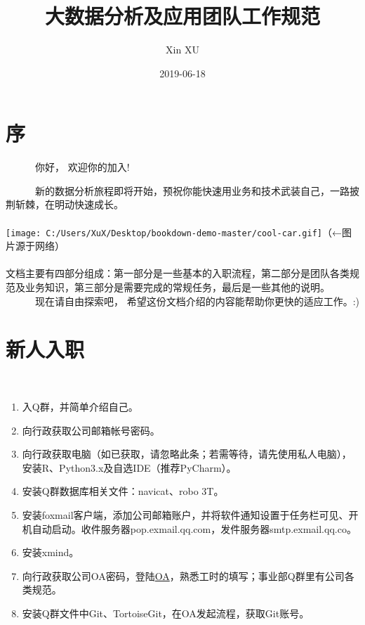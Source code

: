 \documentclass[]{book}
\title{大数据分析及应用团队工作规范}
\author{Xin XU}
\date{2019-06-18}
\begin{document}
\maketitle

{
\setcounter{tocdepth}{1}
\tableofcontents
}
\hypertarget{section}{%
\chapter{序}\label{section}}

~~~~~~你好， 欢迎你的加入!

~~~~~~新的数据分析旅程即将开始，预祝你能快速用业务和技术武装自己，一路披荆斩棘，在明动快速成长。\\
~\\
\hspace*{0.333em}\hspace*{0.333em}\hspace*{0.333em}\hspace*{0.333em}\hspace*{0.333em}\hspace*{0.333em}\texttt{[image: C:/Users/XuX/Desktop/bookdown-demo-master/cool-car.gif]}（←图片源于网络）\\
~\\
\hspace*{0.333em}\hspace*{0.333em}\hspace*{0.333em}\hspace*{0.333em}\hspace*{0.333em}\hspace*{0.333em}文档主要有四部分组成：第一部分是一些基本的入职流程，第二部分是团队各类规范及业务知识，第三部分是需要完成的常规任务，最后是一些其他的说明。\\
~~~~~~现在请自由探索吧， 希望这份文档介绍的内容能帮助你更快的适应工作。:)

\hypertarget{intro}{%
\chapter{新人入职}\label{intro}}

~~~~~~

\begin{enumerate}
\def\labelenumi{\arabic{enumi}.}
\item
  入Q群，并简单介绍自己。
\item
  向行政获取公司邮箱帐号密码。
\item
  向行政获取电脑（如已获取，请忽略此条；若需等待，请先使用私人电脑），安装R、Python3.x及自选IDE（推荐PyCharm）。
\item
  安装Q群数据库相关文件：navicat、robo 3T。
\item
  安装foxmail客户端，添加公司邮箱账户，并将软件通知设置于任务栏可见、开机自动启动。收件服务器pop.exmail.qq.com，发件服务器smtp.exmail.qq.co。
\item
  安装xmind。
\item
  向行政获取公司OA密码，登陆\href{http://192.168.0.212/instance-web/minstone/login}{OA}，熟悉工时的填写；事业部Q群里有公司各类规范。
\item
  安装Q群文件中Git、TortoiseGit，在OA发起流程，获取Git账号。
\end{enumerate}
\end{document}
